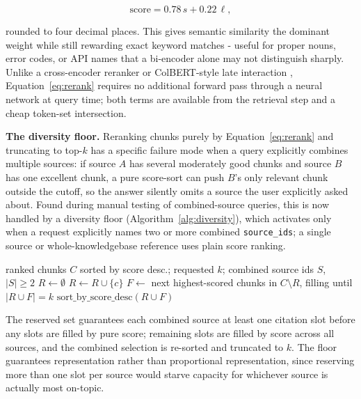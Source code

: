 \documentclass[conference]{IEEEtran}
\begin{document}
\begin{equation}
\mathrm{score} = 0.78 \, s + 0.22 \, \ell,
\label{eq:rerank}
\end{equation}

rounded to four decimal places. This gives semantic similarity the dominant weight while still rewarding exact keyword matches - useful for proper nouns, error codes, or API names that a bi-encoder alone may not distinguish sharply. Unlike a cross-encoder reranker \cite{nogueira2019bert} or ColBERT-style late interaction \cite{khattab2020colbert}, Equation~\ref{eq:rerank} requires no additional forward pass through a neural network at query time; both terms are available from the retrieval step and a cheap token-set intersection.

\textbf{The diversity floor.} Reranking chunks purely by Equation~\ref{eq:rerank} and truncating to top-$k$ has a specific failure mode when a query explicitly combines multiple sources: if source $A$ has several moderately good chunks and source $B$ has one excellent chunk, a pure score-sort can push $B$'s only relevant chunk outside the cutoff, so the answer silently omits a source the user explicitly asked about. Found during manual testing of combined-source queries, this is now handled by a diversity floor (Algorithm~\ref{alg:diversity}), which activates only when a request explicitly names two or more combined \texttt{source\_ids}; a single source or whole-knowledgebase reference uses plain score ranking.

\begin{algorithm}[t]
\caption{Diversity-floor selection}
\label{alg:diversity}
\begin{algorithmic}[1]
\Require ranked chunks $C$ sorted by score desc.; requested $k$; combined source ids $S$, $|S|\geq 2$
\State $R \gets \emptyset$ 
    \State $R \gets R \cup \{c\}$
  \EndIf
\EndFor
\State $F \gets$ next highest-scored chunks in $C \setminus R$, filling until $|R \cup F| = k$
\State \Return $\mathrm{sort\_by\_score\_desc}(R \cup F)$
\end{algorithmic}
\end{algorithm}

The reserved set guarantees each combined source at least one citation slot before any slots are filled by pure score; remaining slots are filled by score across all sources, and the combined selection is re-sorted and truncated to $k$. The floor guarantees representation rather than proportional representation, since reserving more than one slot per source would starve capacity for whichever source is actually most on-topic.
\end{document}
